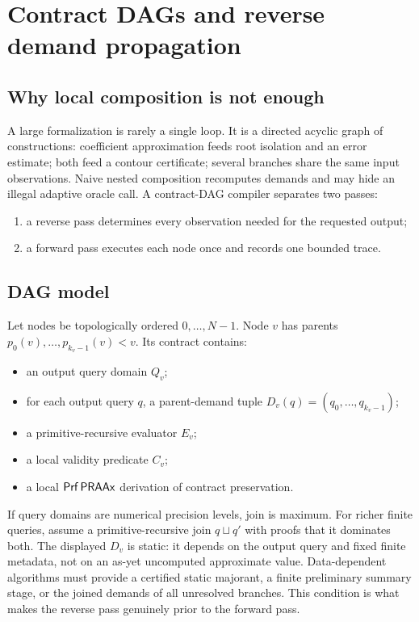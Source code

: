 \section{Contract DAGs and reverse demand propagation}
\label{sec:dag}

\subsection{Why local composition is not enough}

A large formalization is rarely a single loop.  It is a directed acyclic graph
of constructions: coefficient approximation feeds root isolation and an error
estimate; both feed a contour certificate; several branches share the same
input observations.  Naive nested composition recomputes demands and may hide
an illegal adaptive oracle call.  A contract-DAG compiler separates two
passes:
\begin{enumerate}
\item a reverse pass determines every observation needed for the requested
output;
\item a forward pass executes each node once and records one bounded trace.
\end{enumerate}

\subsection{DAG model}

Let nodes be topologically ordered \(0,\ldots,N-1\).  Node \(v\) has parents
\(p_0(v),\ldots,p_{k_v-1}(v)<v\).  Its contract contains:
\begin{itemize}
\item an output query domain \(Q_v\);
\item for each output query \(q\), a parent-demand tuple
\(D_v(q)=(q_0,\ldots,q_{k_v-1})\);
\item a primitive-recursive evaluator \(E_v\);
\item a local validity predicate \(C_v\);
\item a local \(\mathsf{Prf}\,\mathsf{PRAAx}\) derivation of contract preservation.
\end{itemize}
If query domains are numerical precision levels, join is maximum.  For richer
finite queries, assume a primitive-recursive join \(q\sqcup q'\) with proofs
that it dominates both.  The displayed \(D_v\) is static: it depends on the
output query and fixed finite metadata, not on an as-yet uncomputed approximate
value.  Data-dependent algorithms must provide a certified static majorant, a
finite preliminary summary stage, or the joined demands of all unresolved
branches.  This condition is what makes the reverse pass genuinely prior to
the forward pass.

